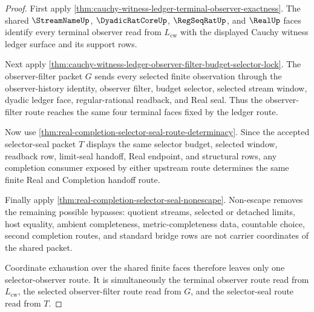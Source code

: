 \begin{proof}
First apply \autoref{thm:cauchy-witness-ledger-terminal-observer-exactness}. The shared $\StreamNameUp$, $\DyadicRatCoreUp$, $\RegSeqRatUp$, and $\RealUp$ faces identify every terminal observer read from $L_{\mathrm{cw}}$ with the displayed Cauchy witness ledger surface and its support rows.

Next apply \autoref{thm:cauchy-witness-ledger-observer-filter-budget-selector-lock}. The observer-filter packet $G$ sends every selected finite observation through the observer-history identity, observer filter, budget selector, selected stream window, dyadic ledger face, regular-rational readback, and Real seal. Thus the observer-filter route reaches the same four terminal faces fixed by the ledger route.

Now use \autoref{thm:real-completion-selector-seal-route-determinacy}. Since the accepted selector-seal packet $T$ displays the same selector budget, selected window, readback row, limit-seal handoff, Real endpoint, and structural rows, any completion consumer exposed by either upstream route determines the same finite Real and Completion handoff route.

Finally apply \autoref{thm:real-completion-selector-seal-nonescape}. Non-escape removes the remaining possible bypasses: quotient streams, selected or detached limits, host equality, ambient completeness, metric-completeness data, countable choice, second completion routes, and standard bridge rows are not carrier coordinates of the shared packet.

Coordinate exhaustion over the shared finite faces therefore leaves only one selector-observer route. It is simultaneously the terminal observer route read from $L_{\mathrm{cw}}$, the selected observer-filter route read from $G$, and the selector-seal route read from $T$.
\end{proof}

